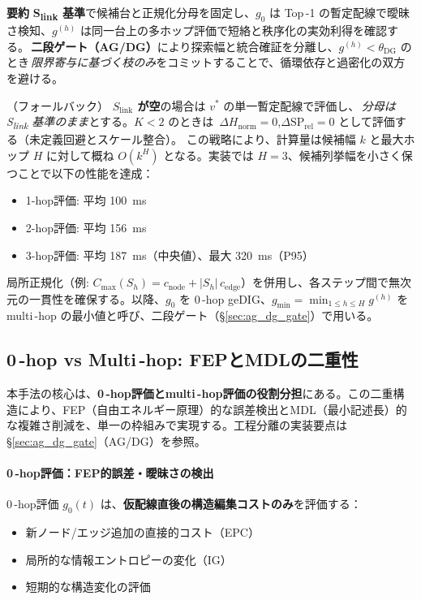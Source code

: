 \documentclass[ja=standard,xelatex]{bxjsarticle}
\begin{document}
\textbf{要約}\; \textbf{S\textsubscript{link} 基準}で候補台と正規化分母を固定し、$g_0$ は Top\,\mbox{-}1 の暫定配線で曖昧さ検知、$g^{(h)}$ は同一台上の多ホップ評価で短絡と秩序化の実効利得を確認する。\,\textbf{二段ゲート（AG/DG）}により探索幅と統合確証を分離し、$g^{(h)}<\theta_{\mathrm{DG}}$ のとき\,\emph{限界寄与に基づく枝のみ}をコミットすることで、循環依存と過密化の双方を避ける。

\noindent （フォールバック）\; \textbf{$S_{\mathrm{link}}$ が空}の場合は $v^*$ の単一暫定配線で評価し、\,\emph{分母は S\textsubscript{link} 基準のまま}とする。$K{<}2$ のときは \,$\Delta H_{\mathrm{norm}}{=}0$,\;$\Delta\mathrm{SP}_{\mathrm{rel}}{=}0$ として評価する（未定義回避とスケール整合）。
この戦略により、計算量は候補幅 $k$ と最大ホップ $H$ に対して概ね $O(k^H)$ となる。実装では $H=3$、候補列挙幅を小さく保つことで以下の性能を達成：
\begin{itemize}
  \item 1-hop評価: 平均 \SI{100}{ms}
  \item 2-hop評価: 平均 \SI{156}{ms}
  \item 3-hop評価: 平均 \SI{187}{ms}（中央値）、最大 \SI{320}{ms}（P95）
\end{itemize}

局所正規化（例: $C_{\max}(S_h)=c_{\mathrm{node}}+|S_h|\,c_{\mathrm{edge}}$）を併用し、各ステップ間で無次元の一貫性を確保する。以降、$g_0$ を 0\,\mbox{-}hop geDIG、$g_{\min}=\min_{1\le h\le H} g^{(h)}$ を multi\,\mbox{-}hop の最小値と呼び、二段ゲート（\S\ref{sec:ag_dg_gate}）で用いる。

\subsection{0\,\mbox{-}hop vs Multi\,\mbox{-}hop: FEPとMDLの二重性}
\label{sec:dual_fep_mdl}
\label{sec:hop_duality}

本手法の核心は、\textbf{0\,\mbox{-}hop評価とmulti\,\mbox{-}hop評価の役割分担}にある。この二重構造により、FEP（自由エネルギー原理）的な誤差検出とMDL（最小記述長）的な複雑さ削減を、単一の枠組みで実現する。工程分離の実装要点は \S\ref{sec:ag_dg_gate}（AG/DG）を参照。

\paragraph{0\,\mbox{-}hop評価：FEP的誤差・曖昧さの検出}
0\,\mbox{-}hop評価 $g_0(t)$ は、\textbf{仮配線直後の構造編集コストのみ}を評価する：
\begin{itemize}
  \item 新ノード/エッジ追加の直接的コスト（EPC）
  \item 局所的な情報エントロピーの変化（IG）
  \item 短期的な構造変化の評価
\end{itemize}
\end{document}
